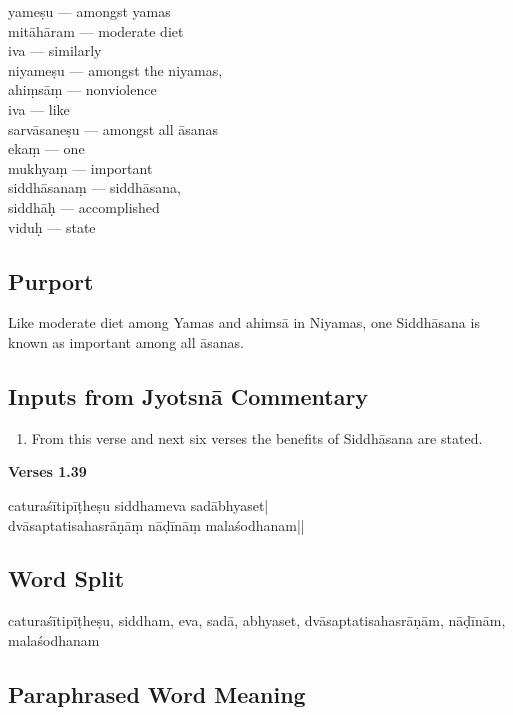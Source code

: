 \begin{multicols}{2}
yameṣu --- amongst yamas \\
mitāhāram --- moderate diet  \\ 
iva --- similarly   \\
niyameṣu ---  amongst the niyamas,  \\
ahiṃsāṃ --- nonviolence  \\
iva ---  like  \\
sarvāsaneṣu --- amongst all āsanas   \\
ekaṃ --- one  \\
mukhyaṃ --- important  \\
siddhāsanaṃ --- siddhāsana,  \\
siddhāḥ --- accomplished   \\
viduḥ --- state
\end{multicols}

\subsection*{Purport}

Like moderate diet  among Yamas and ahimsā in Niyamas, one Siddhāsana is known as important among all āsanas. 

\subsection*{Inputs from Jyotsnā Commentary}

\begin{enumerate}
\item From this verse and next six verses the benefits of Siddhāsana are stated.
\end{enumerate}

\newpage
\noindent \textbf{Verses 1.39}

\begin{shloka}
caturaśītipīṭheṣu siddhameva sadābhyaset|\\
dvāsaptatisahasrāṇāṃ nāḍīnāṃ malaśodhanam||
\end{shloka}

\subsection*{Word Split}

caturaśītipīṭheṣu, siddham,  eva, sadā, abhyaset, dvāsaptatisahasrāṇām, nāḍīnām, malaśodhanam

\subsection*{Paraphrased Word Meaning}


